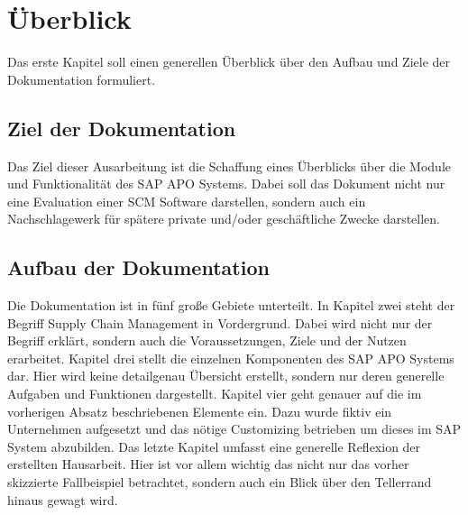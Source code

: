 \section{Überblick}
Das erste Kapitel soll einen generellen Überblick über den Aufbau und Ziele der Dokumentation formuliert.
 
\subsection{Ziel der Dokumentation}
Das Ziel dieser Ausarbeitung ist die Schaffung eines Überblicks über die Module und Funktionalität des SAP APO Systems. Dabei soll das Dokument nicht nur eine Evaluation einer SCM Software darstellen, sondern auch ein Nachschlagewerk für spätere private und/oder geschäftliche Zwecke darstellen.

\subsection{Aufbau der Dokumentation}
Die Dokumentation ist in fünf große Gebiete unterteilt. In Kapitel zwei steht der Begriff Supply Chain Management in Vordergrund. Dabei wird nicht nur der Begriff erklärt, sondern auch die Voraussetzungen, Ziele und der Nutzen erarbeitet. Kapitel drei stellt die einzelnen Komponenten des SAP APO Systems dar. Hier wird keine detailgenau Übersicht erstellt, sondern nur deren generelle Aufgaben und Funktionen dargestellt. Kapitel vier geht genauer auf die im vorherigen Absatz beschriebenen Elemente ein. Dazu wurde fiktiv ein Unternehmen aufgesetzt und das nötige Customizing betrieben um dieses im SAP System abzubilden. Das letzte Kapitel umfasst eine generelle Reflexion der erstellten Hausarbeit. Hier ist vor allem wichtig das nicht nur das vorher skizzierte Fallbeispiel betrachtet, sondern auch ein Blick über den Tellerrand hinaus gewagt wird.